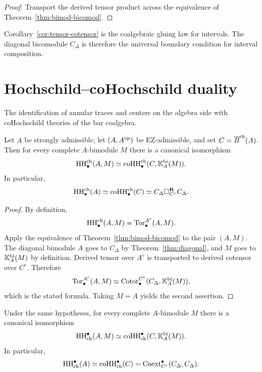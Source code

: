 \begin{proof}
Transport the derived tensor product across the equivalence of
Theorem~\ref{thm:bimod-bicomod}.
\end{proof}

\begin{remark}
Corollary~\ref{cor:tensor-cotensor} is the coalgebraic gluing law for intervals.
The diagonal bicomodule $C_\Delta$ is therefore the universal boundary condition for interval
composition.
\end{remark}

\section{Hochschild--coHochschild duality}

The identification of annular traces and centers on the algebra side with coHochschild theories of the bar
coalgebra.

\begin{theorem}
Let $A$ be strongly admissible, let $(A,A^{\mathrm{op}})$ be EZ-admissible, and set $C=\overline{B}^{\mathrm{ch}}(A)$.
Then for every complete $A$-bimodule $M$ there is a canonical isomorphism
\[
\operatorname{HH}^{\mathrm{ch}}_\bullet(A,M)\simeq
\operatorname{coHH}^{\mathrm{ch}}_\bullet(C,\mathbb{K}_A^{\mathrm{bi}}(M)).
\]
In particular,
\[
\operatorname{HH}^{\mathrm{ch}}_\bullet(A)\simeq \operatorname{coHH}^{\mathrm{ch}}_\bullet(C)
\simeq
C_\Delta \square_{C^e}^{\mathbf R} C_\Delta.
\]
\end{theorem}

\begin{proof}
By definition,
\[
\operatorname{HH}^{\mathrm{ch}}_\bullet(A,M)=\operatorname{Tor}_\bullet^{A^e}(A,M).
\]
Apply the equivalence of Theorem~\ref{thm:bimod-bicomod} to the pair $(A,M)$.
The diagonal bimodule $A$ goes to $C_\Delta$ by Theorem~\ref{thm:diagonal}, and $M$ goes to
$\mathbb{K}_A^{\mathrm{bi}}(M)$ by definition. Derived tensor over $A^e$ is transported to derived cotensor
over $C^e$. Therefore
\[
\operatorname{Tor}_\bullet^{A^e}(A,M)\simeq \operatorname{Cotor}_\bullet^{C^e}(C_\Delta,\mathbb{K}_A^{\mathrm{bi}}(M)),
\]
which is the stated formula. Taking $M=A$ yields the second assertion.
\end{proof}

\begin{theorem}
Under the same hypotheses, for every complete $A$-bimodule $M$ there is a canonical isomorphism
\[
\operatorname{HH}_{\mathrm{ch}}^\bullet(A,M)\simeq
\operatorname{coHH}_{\mathrm{ch}}^\bullet(C,\mathbb{K}_A^{\mathrm{bi}}(M)).
\]
In particular,
\[
\operatorname{HH}_{\mathrm{ch}}^\bullet(A)\simeq
\operatorname{coHH}_{\mathrm{ch}}^\bullet(C)
=
\operatorname{Coext}_{C^e}^\bullet(C_\Delta,C_\Delta).
\]
\end{theorem}

